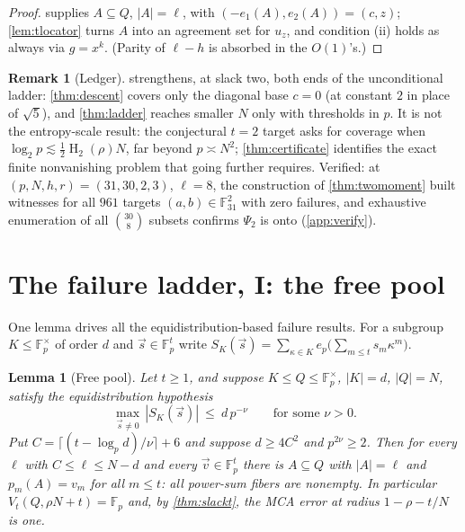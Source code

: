 \documentclass[11pt]{article}
\newtheorem{lemma}[lemma]{Lemma}
\theoremstyle{definition}
\newtheorem{remark}[remark]{Remark}
\newcommand{\F}{\mathbb F}
\newcommand{\HH}{\operatorname{H}_2}
\begin{document}
\begin{proof}
 supplies $A\subseteq Q$, $|A|=\ell$, with $(-e_1(A),e_2(A))=(c,z)$; \cref{lem:tlocator} turns $A$ into an agreement set for $u_z$, and condition (ii) holds as always via $g=x^k$.  (Parity of $\ell-h$ is absorbed in the $O(1)$'s.)
\end{proof}

\begin{remark}[Ledger]\label{rem:twomomentledger}
 strengthens, at slack two, both ends of the unconditional ladder: \cref{thm:descent} covers only the diagonal base $c=0$ (at constant $2$ in place of $\sqrt5$), and \cref{thm:ladder} reaches smaller $N$ only with thresholds in $p$.  It is not the entropy-scale result: the conjectural $t=2$ target asks for coverage when $\log_2p\lesssim\tfrac12\HH(\rho)N$, far beyond $p\asymp N^2$; \cref{thm:certificate} identifies the exact finite nonvanishing problem that going further requires.  Verified: at $(p,N,h,r)=(31,30,2,3)$, $\ell=8$, the construction of \cref{thm:twomoment} built witnesses for all $961$ targets $(a,b)\in\F_{31}^2$ with zero failures, and exhaustive enumeration of all $\binom{30}8$ subsets confirms $\Psi_2$ is onto (\cref{app:verify}).
\end{remark}

\section{The failure ladder, I: the free pool}\label{sec:pool}

One lemma drives all the equidistribution-based failure results.  For a subgroup $K\le\F_p^\times$ of order $d$ and $\vec s\in\F_p^t$ write $S_K(\vec s)=\sum_{\kappa\in K}e_p\big(\sum_{m\le t}s_m\kappa^m\big)$.

\begin{lemma}[Free pool]\label{lem:pool}
Let $t\ge1$, and suppose $K\le Q\le\F_p^\times$, $|K|=d$, $|Q|=N$, satisfy the equidistribution hypothesis
\[
        \max_{\vec s\ne0}\,|S_K(\vec s)|\ \le\ d\,p^{-\nu}
        \qquad\text{for some }\nu>0 .
\]
Put $C=\lceil(t-\log_pd)/\nu\rceil+6$ and suppose $d\ge4C^2$ and $p^{2\nu}\ge2$.  Then for every $\ell$ with $C\le\ell\le N-d$ and every $\vec v\in\F_p^t$ there is $A\subseteq Q$ with $|A|=\ell$ and $p_m(A)=v_m$ for all $m\le t$: all power-sum fibers are nonempty.  In particular $V_t(Q,\rho N+t)=\F_p$ and, by \cref{thm:slackt}, the MCA error at radius $1-\rho-t/N$ is one.
\end{lemma}
\end{document}
